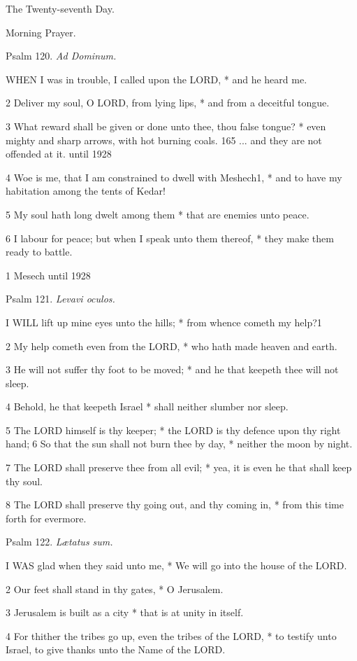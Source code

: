 The
Twenty-seventh Day.

Morning
Prayer.

Psalm
120. \emph{Ad Dominum.}

WHEN
I was in trouble, I called upon the LORD, * and he heard me.

2 Deliver my soul, O LORD, from lying lips, * and from
a deceitful tongue.

3 What reward shall be given or done unto thee, thou
false tongue? * even mighty and sharp arrows, with hot burning coals. 165 ... and they are not offended
at it. until
1928

4 Woe is me, that I am constrained to dwell with Meshech1, *
and to have my habitation among the tents of Kedar!

5 My soul hath long dwelt among them * that are enemies
unto peace.

6 I labour for peace; but when I speak unto them thereof,
* they make them ready to battle.

1
Mesech until
1928

Psalm
121. \emph{Levavi oculos.}

I
WILL lift up mine eyes unto the hills; * from whence cometh my help?1

2 My help cometh even from the LORD, * who hath made
heaven and earth.

3 He will not suffer thy foot to be moved; * and he
that keepeth thee will not sleep.

4 Behold, he that keepeth Israel * shall neither slumber
nor sleep.

5 The LORD himself is thy keeper; * the LORD is thy
defence upon thy right hand;6 So that the sun shall not burn thee by
day, * neither the moon by night.

7 The LORD shall preserve thee from all evil; * yea,
it is even he that shall keep thy soul.

8 The LORD shall preserve thy going out, and thy coming
in, * from this time forth for evermore.

Psalm
122. \emph{Lætatus sum.}

I
WAS glad when they said unto me, * We will go into the house of the LORD.

2 Our feet shall stand in thy gates, * O Jerusalem.

3 Jerusalem is built as a city * that is at unity in
itself.

4 For thither the tribes go up, even the tribes of
the LORD, * to testify unto Israel, to give thanks unto the Name of the
LORD.

